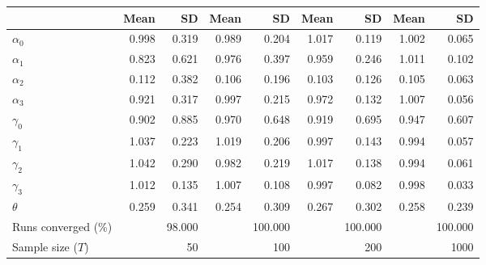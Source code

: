 
\begin{tabular}[t]{lrrrrrrrr}
\toprule
  & Mean & SD & Mean  & SD  & Mean   & SD   & Mean    & SD   \\
\midrule
$\alpha_{0}$ & 0.998 & 0.319 & 0.989 & 0.204 & 1.017 & 0.119 & 1.002 & 0.065\\
$\alpha_{1}$ & 0.823 & 0.621 & 0.976 & 0.397 & 0.959 & 0.246 & 1.011 & 0.102\\
$\alpha_{2}$ & 0.112 & 0.382 & 0.106 & 0.196 & 0.103 & 0.126 & 0.105 & 0.063\\
$\alpha_{3}$ & 0.921 & 0.317 & 0.997 & 0.215 & 0.972 & 0.132 & 1.007 & 0.056\\
$\gamma_{0}$ & 0.902 & 0.885 & 0.970 & 0.648 & 0.919 & 0.695 & 0.947 & 0.607\\
$\gamma_{1}$ & 1.037 & 0.223 & 1.019 & 0.206 & 0.997 & 0.143 & 0.994 & 0.057\\
$\gamma_{2}$ & 1.042 & 0.290 & 0.982 & 0.219 & 1.017 & 0.138 & 0.994 & 0.061\\
$\gamma_{3}$ & 1.012 & 0.135 & 1.007 & 0.108 & 0.997 & 0.082 & 0.998 & 0.033\\
$\theta$ & 0.259 & 0.341 & 0.254 & 0.309 & 0.267 & 0.302 & 0.258 & 0.239\\
Runs converged (\%) &  & 98.000 &  & 100.000 &  & 100.000 &  & 100.000\\
Sample size ($T$) &  & 50 &  & 100 &  & 200 &  & 1000\\
\bottomrule
\end{tabular}
